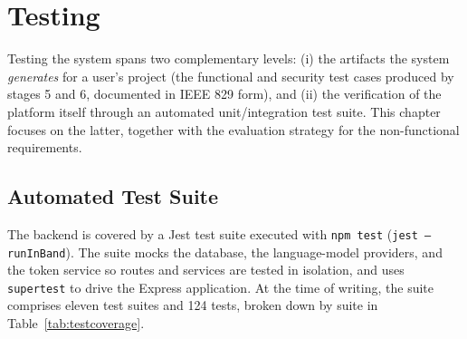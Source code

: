 \documentclass[12pt,a4paper,oneside]{report}
\begin{document}
\chapter{Testing}
Testing the system spans two complementary levels: (i) the artifacts the system \emph{generates} for a user's project (the functional and security test cases produced by stages 5 and 6, documented in IEEE 829 form), and (ii) the verification of the platform itself through an automated unit/integration test suite. This chapter focuses on the latter, together with the evaluation strategy for the non-functional requirements.

\section{Automated Test Suite}
The backend is covered by a Jest test suite executed with \texttt{npm test} (\texttt{jest --runInBand}). The suite mocks the database, the language-model providers, and the token service so routes and services are tested in isolation, and uses \texttt{supertest} to drive the Express application. At the time of writing, the suite comprises eleven test suites and 124 tests, broken down by suite in Table~\ref{tab:testcoverage}.
\end{document}
